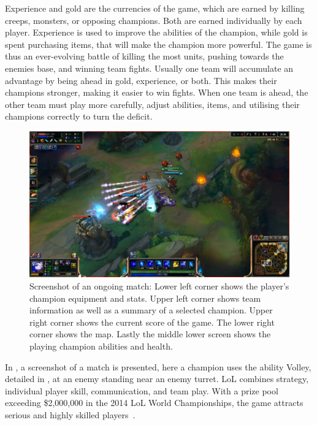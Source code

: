 Experience and gold are the currencies of the game, which are earned by killing creeps, monsters, or opposing champions. Both are earned individually by each player. Experience is used to improve the abilities of the champion, while gold is spent purchasing items, that will make the champion more powerful. The game is thus an ever-evolving battle of killing the most units, pushing towards the enemies base, and winning team fights. Usually one team will accumulate an advantage by being ahead in gold, experience, or both. This makes their champions stronger, making it easier to win fights. When one team is ahead, the other team must play more carefully, adjust abilities, items, and utilising their champions correctly to turn the deficit.

\begin{figure}[!htb]
  \centering
    \includegraphics[width=1\textwidth]{img/lolgame.png}
  \caption{Screenshot of an ongoing match: Lower left corner shows the player's champion equipment and stats. Upper left corner shows team information as well as a summary of a selected champion. Upper right corner shows the current score of the game. The lower right corner shows the map. Lastly the middle lower screen shows the playing champion abilities and health.}\label{fig:lolgame}
\end{figure}

In , a screenshot of a match is presented, here a champion uses the ability Volley, detailed in , at an enemy standing near an enemy turret. LoL combines strategy, individual player skill, communication, and team play. With a prize pool exceeding \$2,000,000 in the 2014 LoL World Championships, the game attracts serious and highly skilled players~\cite{lolprize}.



